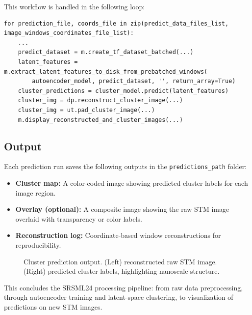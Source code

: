 \documentclass[11pt]{article}
\begin{document}
This workflow is handled in the following loop:

\begin{verbatim}
for prediction_file, coords_file in zip(predict_data_files_list, image_windows_coordinates_file_list):
    ...
    predict_dataset = m.create_tf_dataset_batched(...)
    latent_features = m.extract_latent_features_to_disk_from_prebatched_windows(
        autoencoder_model, predict_dataset, '', return_array=True)
    cluster_predictions = cluster_model.predict(latent_features)
    cluster_img = dp.reconstruct_cluster_image(...)
    cluster_img = ut.pad_cluster_image(...)
    m.display_reconstructed_and_cluster_images(...)
\end{verbatim}

\subsection*{Output}

Each prediction run saves the following outputs in the \texttt{predictions\_path} folder:

\begin{itemize}
  \item \textbf{Cluster map:} A color-coded image showing predicted cluster labels for each image region.
  \item \textbf{Overlay (optional):} A composite image showing the raw STM image overlaid with transparency or color labels.
  \item \textbf{Reconstruction log:} Coordinate-based window reconstructions for reproducibility.
\end{itemize}

\begin{figure}[H]
\centering
\hspace{1em}
\caption{Cluster prediction output. (Left) reconstructed raw STM image. (Right) predicted cluster labels, highlighting nanoscale structure.}
\end{figure}

This concludes the SRSML24 processing pipeline: from raw data preprocessing, through autoencoder training and latent-space clustering, to visualization of predictions on new STM images.
\end{document}

